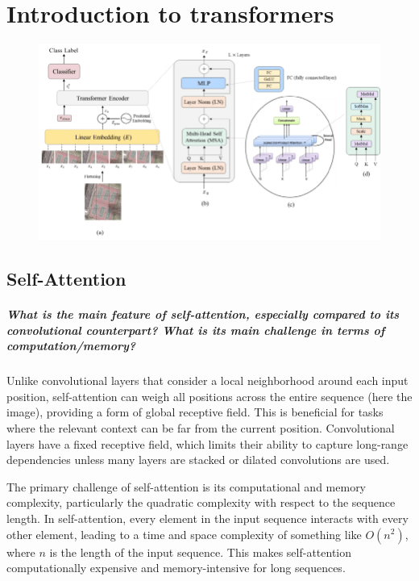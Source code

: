 \chapter{Introduction to transformers}

\begin{figure}[H]
    \centering
    \includegraphics*[width=.8\textwidth]{figs/Transformers/The-Vision-Transformer-architecture-a-the-main-architecture-of-the-model-b-the.png}
\end{figure}


\section{Self-Attention}
\paragraph{What is the main feature of self-attention, especially compared to its convolutional counterpart? What is its main challenge in terms of computation/memory?}
Unlike convolutional layers that consider a local neighborhood around each input position, self-attention can weigh all positions across the entire sequence (here the image), providing a form of global receptive field. This is beneficial for tasks where the relevant context can be far from the current position. Convolutional layers have a fixed receptive field, which limits their ability to capture long-range dependencies unless many layers are stacked or dilated convolutions are used.

The primary challenge of self-attention is its computational and memory complexity, particularly the quadratic complexity with respect to the sequence length. In self-attention, every element in the input sequence interacts with every other element, leading to a time and space complexity of something like $ O(n^2) $, where $n$ is the length of the input sequence. This makes self-attention computationally expensive and memory-intensive for long sequences.

